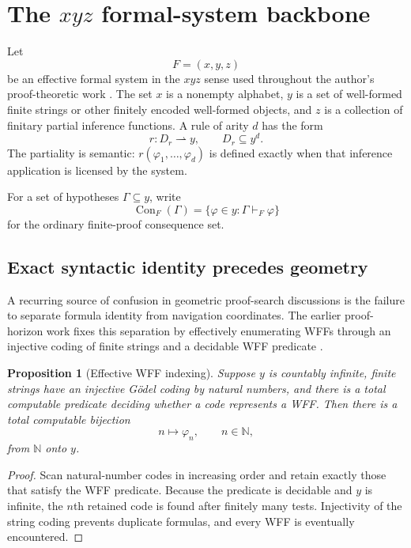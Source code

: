 \documentclass[11pt]{article}
\newtheorem{proposition}[theorem]{Proposition}
\theoremstyle{definition}
\newcommand{\Con}{\operatorname{Con}}
\newcommand{\N}{\mathbb N}
\begin{document}
\section{The \texorpdfstring{$xyz$}{xyz} formal-system backbone}

Let
\[
F=(x,y,z)
\]
be an effective formal system in the $xyz$ sense used throughout the author's proof-theoretic work \cite{TennesonElements}. The set $x$ is a nonempty alphabet, $y$ is a set of well-formed finite strings or other finitely encoded well-formed objects, and $z$ is a collection of finitary partial inference functions. A rule of arity $d$ has the form
\[
r:D_r\rightharpoonup y,
\qquad D_r\subseteq y^d.
\]
The partiality is semantic: $r(\varphi_1,\ldots,\varphi_d)$ is defined exactly when that inference application is licensed by the system.

For a set of hypotheses $\Gamma\subseteq y$, write
\[
\Con_F(\Gamma)=\{\varphi\in y:\Gamma\vdash_F\varphi\}
\]
for the ordinary finite-proof consequence set.

\subsection{Exact syntactic identity precedes geometry}

A recurring source of confusion in geometric proof-search discussions is the failure to separate formula identity from navigation coordinates. The earlier proof-horizon work fixes this separation by effectively enumerating WFFs through an injective coding of finite strings and a decidable WFF predicate \cite{TennesonUPH}.

\begin{proposition}[Effective WFF indexing]\label{prop:wff-index}
Suppose $y$ is countably infinite, finite strings have an injective G\"odel coding by natural numbers, and there is a total computable predicate deciding whether a code represents a WFF. Then there is a total computable bijection
\[
 n\longmapsto \varphi_n,
 \qquad n\in\N,
\]
from $\N$ onto $y$.
\end{proposition}

\begin{proof}
Scan natural-number codes in increasing order and retain exactly those that satisfy the WFF predicate. Because the predicate is decidable and $y$ is infinite, the $n$th retained code is found after finitely many tests. Injectivity of the string coding prevents duplicate formulas, and every WFF is eventually encountered.
\end{proof}
\end{document}
